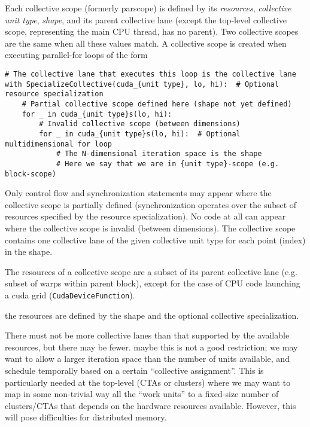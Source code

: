 \filbreak
{} Each collective scope (formerly parscope) is defined by its \textit{resources}, \textit{collective unit type}, \textit{shape}, and its parent collective lane (except the top-level collective scope, representing the main CPU thread, has no parent). Two collective scopes are the same when all these values match. A collective scope is created when executing parallel-for loops of the form

{\color{lightttColor}
\begin{verbatim}
# The collective lane that executes this loop is the collective lane
with SpecializeCollective(cuda_{unit type}, lo, hi):  # Optional resource specialization
    # Partial collective scope defined here (shape not yet defined)
    for _ in cuda_{unit type}s(lo, hi):
        # Invalid collective scope (between dimensions)
        for _ in cuda_{unit type}s(lo, hi):  # Optional multidimensional for loop
            # The N-dimensional iteration space is the shape
            # Here we say that we are in {unit type}-scope (e.g. block-scope)
\end{verbatim}
}

\filbreak
Only control flow and synchronization statements may appear where the collective scope is partially defined (synchronization operates over the subset of resources specified by the resource specialization).
No code at all can appear where the collective scope is invalid (between dimensions).
The collective scope contains one collective lane of the given collective unit type for each point (index) in the shape.

The resources of a collective scope are a subset of its parent collective lane (e.g. subset of warps within parent block), except for the case of CPU code launching a cuda grid (\texttt{CudaDeviceFunction}).

the resources are defined by the shape and the optional collective specialization.

There must not be more collective lanes than that supported by the available resources, but there may be fewer.
 maybe this is not a good restriction; we may want to allow a larger iteration space than the number of units available, and schedule temporally based on a certain ``collective assignment''.
This is particularly needed at the top-level (CTAs or clusters) where we may want to map in some non-trivial way all the ``work units'' to a fixed-size number of clusters/CTAs that depends on the hardware resources available.
However, this will pose difficulties for distributed memory.

